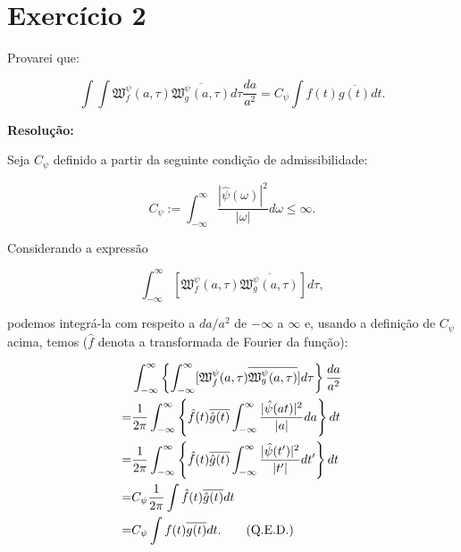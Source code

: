 
\section*{\large Exercício 2}
%

Provarei que:

\begin{equation*}
\int \int \mathfrak{W}_{f}^{\psi}(a,\tau)\overline{\mathfrak{W}_{g}^{\psi}(a,\tau)}d \tau \frac{d a}{a^{2}} = C_{\psi}\int f(t)\overline{g(t)}dt.
\end{equation*}

\textbf{Resolução:}

Seja $C_{\psi}$ definido a partir da seguinte condição de admissibilidade:

\begin{equation}
C_{\psi} := \int_{-\infty}^{\infty}\frac{|\hat{\psi}(\omega)|^{2}}{|\omega|}d\omega \leq \infty.
\end{equation}

Considerando a expressão

\begin{equation*}
\int_{-\infty}^{\infty}[\mathfrak{W}_{f}^{\psi}(a,\tau)\overline{\mathfrak{W}_{g}^{\psi}(a,\tau)}]d \tau,
\end{equation*}

podemos integrá-la com respeito a $da/a^{2}$ de $-\infty$ a $\infty$ e, usando a definição de $C_{\psi}$ acima, temos ($\hat{f}$ denota a transformada de Fourier da função):

\begin{align*}
& \int_{-\infty}^{\infty} \left\{ \int_{-\infty}^{\infty}[\mathfrak{W}_{f}^{\psi}(a,\tau)\overline{\mathfrak{W}_{g}^{\psi}(a,\tau)}]d \tau  \right\} \frac{d a}{a^{2}} \\
=& \frac{1}{2\pi}\int_{-\infty}^{\infty} \left\{ \hat{f}(t)\overline{\hat{g}(t)} \int_{-\infty}^{\infty} \frac{|\hat{\psi}(at)|^{2}}{|a|}da \right\} dt \\
=& \frac{1}{2\pi}\int_{-\infty}^{\infty} \left\{ \hat{f}(t)\overline{\hat{g}(t)} \int_{-\infty}^{\infty} \frac{|\hat{\psi}(t')|^{2}}{|t'|}dt' \right\} dt \\
=& C_{\psi}\frac{1}{2\pi} \int \hat{f}(t)\overline{\hat{g}(t)}dt\\
=& C_{\psi} \int f(t)\overline{g(t)}dt.  \tag*{\text{(Q.E.D.)}}
\end{align*}


